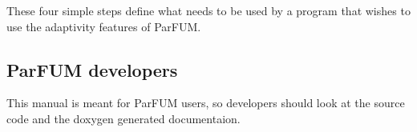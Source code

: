 

These four simple steps define what needs to be used by a program that wishes
to use the adaptivity features of ParFUM.

\subsection{ParFUM developers}
This manual is meant for ParFUM users, so developers should look at the source code
and the doxygen generated documentaion.

